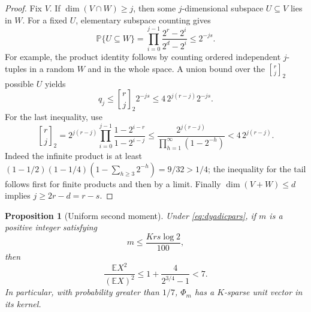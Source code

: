 \documentclass[11pt]{article}
\newtheorem{proposition}[theorem]{Proposition}
\theoremstyle{remark}
\newcommand{\E}{\mathbb E}
\newcommand{\Prob}{\mathbb P}
\newcommand{\1}{\mathbf 1}
\newcommand{\gaussbinom}[2]{\genfrac{[}{]}{0pt}{}{#1}{#2}_{\!2}}
\begin{document}
\begin{proof}
Fix $V$. If $\dim(V\cap W)\geq j$, then some $j$-dimensional subspace
$U\subseteq V$ lies in $W$. For a fixed $U$, elementary subspace counting
gives
\[
 \Prob\{U\subseteq W\}
 =\prod_{i=0}^{j-1}\frac{2^r-2^i}{2^d-2^i}
 \leq2^{-js}.
\]
For example, the product identity follows by counting ordered independent
$j$-tuples in a random $W$ and in the whole space. A union bound over the
$\gaussbinom rj$ possible $U$ yields
\[
 q_j\leq\gaussbinom rj 2^{-js}
 \leq4\,2^{j(r-j)}2^{-js}.
\]
For the last inequality, use
\[
 \gaussbinom rj
 =2^{j(r-j)}
 \prod_{i=0}^{j-1}\frac{1-2^{i-r}}{1-2^{i-j}}
 \leq \frac{2^{j(r-j)}}{\prod_{h=1}^\infty(1-2^{-h})}
 <4\,2^{j(r-j)}.
\]
Indeed the infinite product is at least
$(1-1/2)(1-1/4)(1-\sum_{h\geq3}2^{-h})=9/32>1/4$;
the inequality for the tail follows first for finite products and then
by a limit. Finally $\dim(V+W)\leq d$ implies $j\geq2r-d=r-s$.
\end{proof}

\begin{proposition}[Uniform second moment]\label{prop:second}
Under \eqref{eq:dyadicpars}, if $m$ is a positive integer satisfying
\begin{equation}\label{eq:lowerthreshold}
 m\leq\frac{Krs\log2}{100},
\end{equation}
then
\begin{equation}\label{eq:ratio}
 \frac{\E X^2}{(\E X)^2}
 \leq1+\frac4{2^{3/4}-1}<7.
\end{equation}
In particular, with probability greater than $1/7$, $\Phi_m$ has a
$K$-sparse unit vector in its kernel.
\end{proposition}
\end{document}
